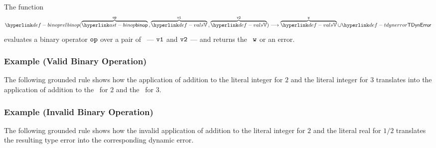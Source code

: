 \hypertarget{def-binoprel}{}
The function
\[
  \binoprel(\overname{\binop}{\op} \aslsep \overname{\vals}{\vvone} \aslsep \overname{\vals}{\vvtwo})
  \aslto \overname{\vals}{\vw} \cup \TDynError
\]
evaluates a binary operator $\op$ over a pair of \nativevalues\  --- $\vvone$ and $\vvtwo$ --- and returns the
\nativevalue\  $\vw$ or an error.

\subsubsection{Example (Valid Binary Operation)}
The following grounded rule shows how the application of addition
to the literal integer for $2$ and the literal integer for $3$
translates into the application of addition to the \nativevalue\ for $2$
and the \nativevalue\ for $3$.
\begin{mathpar}
\end{mathpar}

\subsubsection{Example (Invalid Binary Operation)}
The following grounded rule shows how the invalid application of addition
to the literal integer for $2$ and the literal real for $1/2$
translates the resulting type error into the corresponding dynamic error.
\begin{mathpar}
\end{mathpar}

